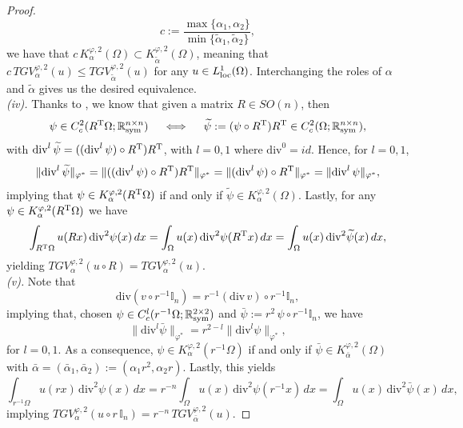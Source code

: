 \documentclass[a4paper,11pt,oneside,notitlepage]{article}
\numberwithin{equation}{section}
\def\R{\mathbb{R}}
\def\I{\mathbb{I}_n}
\def\loc{{\rm loc}}
\def\sym{{\rm sym}}
\renewcommand{\div}{\mathrm{div}}
\newcommand{\T}{\textnormal{T}}
\newcommand{\vphi}{\varphi}
\begin{document}
\begin{proof}
\begin{equation*}
        c := \frac{\max\{\alpha_1, \alpha_2\}}{\min\{\tilde\alpha_1, \tilde\alpha_2\}},
    \end{equation*}
    we have that $c \, K^{\vphi,2}_\alpha(\Omega) \subset K^{\vphi,2}_{\tilde\alpha}(\Omega)$, meaning that $c \, TGV^{\vphi,2}_\alpha(u) \le TGV^{\vphi,2}_{\tilde\alpha}(u)$ for any $u \in L^1_\loc(\Omega)$. Interchanging the roles of $\alpha$ and $\tilde\alpha$ gives us the desired equivalence.
    \\
    {\it (iv).} Thanks to \cite[(A.4)]{BKP10}, we know that given a matrix $R \in SO(n)$, then
    \begin{equation*}
        \psi \in C^2_c (R^\T\Omega; \R^{n \times n}_\sym) \quad \iff \quad \widetilde\psi := (\psi \circ R^\T)R^\T \in C^2_c (\Omega; \R^{n \times n}_\sym),
    \end{equation*}
    with $\div^l \, \widetilde\psi = ((\div^l \, \psi) \circ R^\T)R^\T$, with $l = 0,1$ where $\div^0 = id$. Hence, for $l = 0,1$,
    \begin{equation*}
        \|\div^l \, \widetilde\psi\|_{\vphi^*} = \| ((\div^l \, \psi) \circ R^\T)R^\T \|_{\vphi^*} = \| (\div^l \, \psi) \circ R^\T \|_{\vphi^*} = \| \div^l \, \psi \|_{\vphi^*},
    \end{equation*}
    implying that $\psi \in K^{\vphi,2}_\alpha(R^\T\Omega)$ if and only if $\widetilde\psi \in K^{\vphi,2}_\alpha(\Omega)$. Lastly, for any $\psi \in K^{\vphi,2}_\alpha(R^\T\Omega)$ we have
    \begin{equation*}
        \int_{R^\T\Omega} u(Rx) \,\div^2 \psi(x) \, dx = \int_\Omega u(x) \,\div^2 \psi(R^\T x) \, dx = \int_\Omega u(x) \, \div^2 \widetilde\psi(x) \, dx,
    \end{equation*}
    yielding $TGV^{\vphi,2}_\alpha(u \circ R) = TGV^{\vphi,2}_\alpha(u)$.
    \\
    {\it (v).} Note that
    \begin{equation*}
        \div (v \circ r^{-1} \I) = r^{-1} (\div \, v) \circ r^{-1} \I,
    \end{equation*}
    implying that, chosen $\psi \in C^l_c(r^{-1}\Omega;\R^{2 \times 2}_\sym)$ and $\bar\psi := r^2 \, \psi \circ r^{-1} \I$, we have
    \begin{equation*}
        \| \div^l \bar\psi \|_{\vphi^*} = r^{2-l} \| \div^l \psi \|_{\vphi^*},
    \end{equation*}
    for $l = 0,1$. As a consequence, $\psi \in K^{\vphi,2}_\alpha(r^{-1} \Omega)$ if and only if $\bar\psi \in K^{\vphi,2}_{\bar\alpha}(\Omega)$ with $\bar\alpha = (\bar\alpha_1, \bar\alpha_2) := (\alpha_1 r^2, \alpha_2 r)$. Lastly, this yields
    \begin{equation*}
        \int_{r^{-1} \Omega} u(rx) \,\div^2 \psi(x) \, dx = r^{-n} \int_\Omega u(x) \,\div^2 \psi(r^{-1} x) \, dx = \int_\Omega u(x) \, \div^2 \bar\psi(x) \, dx,
    \end{equation*}
    implying $TGV^{\vphi,2}_\alpha(u \circ r \, \I) = r^{-n} \, TGV^{\vphi,2}_{\bar\alpha}(u)$.
\end{proof}
\end{document}

